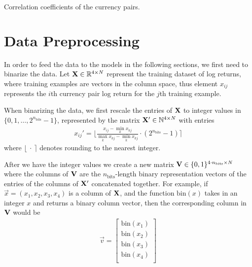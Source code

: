 \begin{table}[!htb]
    \centering
    \begin{adjustbox}{max width=\textwidth}
        
    \end{adjustbox}
    \caption{Correlation coefficients of the currency pairs.}
    \label{tbl:data_correlation_coefficients}
\end{table}


\section{Data Preprocessing}
In order to feed the data to the models in the following sections, we first need to binarize the data.
Let \( \mathbf{X} \in \mathbb{R}^{4 \times N} \) represent the training dataset of log returns, where training examples are vectors in the column space, thus element \( x_{ij} \) represents the \( i \)th currency pair log return for the \( j \)th training example.

When binarizing the data, we first rescale the entries of \( \mathbf{X} \) to integer values in \( \{0, 1, \dots, 2^{n_\text{bits}} - 1\} \), represented by the matrix \( \mathbf{X}' \in \mathbb{N}^{4 \times N} \) with entries
\begin{align}
    x_{ij}' = \bigg\lfloor \frac{x_{ij} - \min_k x_{kj}}{\max_k x_{kj} - \min_k x_{kj}} \cdot (2^{n_\text{bits}} - 1) \bigg\rceil
\end{align}
where \( \lfloor \ \cdot \ \rceil \) denotes rounding to the nearest integer.

After we have the integer values we create a new matrix \( \mathbf{V} \in \{0,1\}^{4\cdot n_\text{bits} \times N} \) where the columns of \( \mathbf{V} \) are the \( n_\text{bits} \)-length binary representation vectors of the entries of the columns of \( \mathbf{X}' \) concatenated together.
For example, if \( \vec{x} = (x_1,x_2,x_3,x_4) \) is a column of \( \mathbf{X} \), and the function \( \text{bin}(x) \) takes in an integer \( x \) and returns a binary column vector, then the corresponding column in \( \mathbf{V} \) would be
\begin{align}
    \vec{v} = \begin{bmatrix}
        \text{bin}(x_1) \\
        \text{bin}(x_2) \\
        \text{bin}(x_3) \\
        \text{bin}(x_4) \\
    \end{bmatrix}
\end{align}


